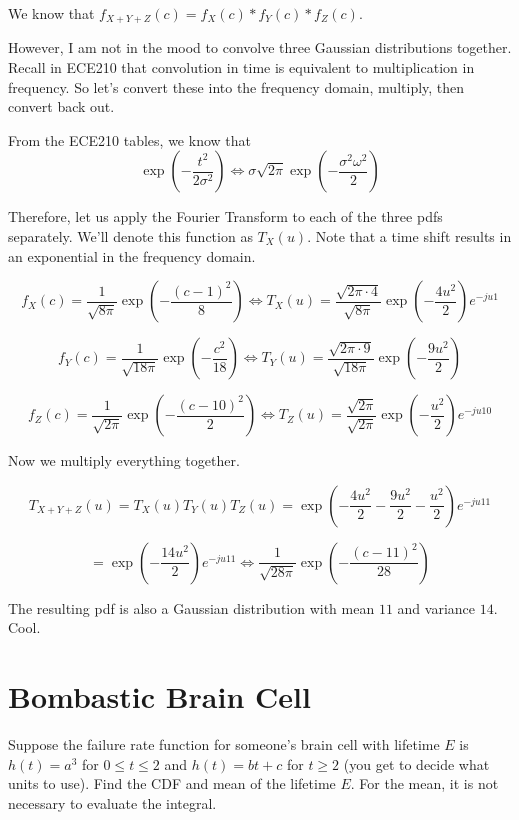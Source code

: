 \documentclass{article}
\begin{document}
We know that $f_{X + Y + Z}(c) = f_X(c) \ast f_Y(c) \ast f_Z(c)$.

However, I am not in the mood to convolve three Gaussian distributions together. Recall in ECE210 that convolution in time is equivalent to multiplication in frequency. So let's convert these into the frequency domain, multiply, then convert back out.

From the ECE210 tables, we know that $$\exp \left(- \frac{t^2}{2 \sigma^2}\right) \Longleftrightarrow \sigma \sqrt{2\pi} \exp \left(- \frac{\sigma^2 \omega^2}{2}\right)$$

Therefore, let us apply the Fourier Transform to each of the three pdfs separately. We'll denote this function as $T_X(u)$. Note that a time shift results in an exponential in the frequency domain.

$$f_X(c) = \frac{1}{\sqrt{8\pi}} \exp \left(- \frac{(c - 1)^2}{8}\right) \Longleftrightarrow T_X(u) = \frac{\sqrt{2\pi \cdot 4}}{\sqrt{8\pi}} \exp \left( - \frac{4u^2}{2}\right) e^{-j u 1}$$

$$f_Y(c) = \frac{1}{\sqrt{18\pi}} \exp \left(- \frac{c^2}{18}\right) \Longleftrightarrow T_Y(u) = \frac{\sqrt{2\pi \cdot 9}}{\sqrt{18\pi}} \exp \left(- \frac{9u^2}{2}\right)$$

$$f_Z(c) = \frac{1}{\sqrt{2\pi}} \exp \left(- \frac{(c - 10)^2}{2}\right) \Longleftrightarrow T_Z(u) = \frac{\sqrt{2\pi}}{\sqrt{2\pi}} \exp \left(- \frac{u^2}{2}\right)e^{-j u 10}$$

Now we multiply everything together.

$$T_{X + Y + Z}(u) = T_X(u) T_Y(u) T_Z(u) = \exp \left(-\frac{4u^2}{2} -\frac{9u^2}{2} -\frac{u^2}{2} \right) e^{-j u 11}$$

$$= \exp \left(-\frac{14u^2}{2}\right) e^{-j u 11} \Longleftrightarrow \boxed{\frac{1}{\sqrt{28\pi}} \exp \left(- \frac{(c - 11)^2}{28}\right)}$$

The resulting pdf is also a Gaussian distribution with mean $11$ and variance $14$. Cool.

\newpage

\section{Bombastic Brain Cell}

Suppose the failure rate function for someone's brain cell with lifetime $E$ is $h(t) = a^3$ for $0 \leq t \leq 2$ and $h(t) = bt + c$ for $t \geq 2$ (you get to decide what units to use). Find the CDF and mean of the lifetime $E$. For the mean, it is not necessary to evaluate the integral.
\end{document}

